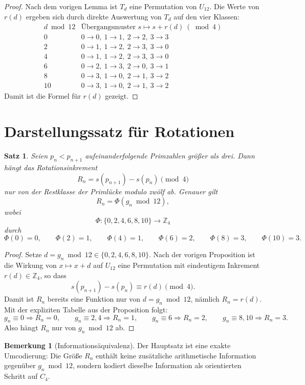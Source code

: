 \documentclass[11pt]{article}
\newtheorem{theorem}{Satz}
\theoremstyle{definition}
\newtheorem{remark}{Bemerkung}
\begin{document}
\begin{proof}
Nach dem vorigen Lemma ist $T_d$ eine Permutation von $U_{12}$.
Die Werte von $r(d)$ ergeben sich durch direkte Auswertung von $T_d$ auf den vier Klassen:
\[
\begin{array}{c|c}
d \bmod 12 & \text{\"Ubergangsmuster } s\mapsto s+r(d)\ (\bmod 4)\\
\hline
0   & 0\to0,\ 1\to1,\ 2\to2,\ 3\to3\\
2   & 0\to1,\ 1\to2,\ 2\to3,\ 3\to0\\
4   & 0\to1,\ 1\to2,\ 2\to3,\ 3\to0\\
6   & 0\to2,\ 1\to3,\ 2\to0,\ 3\to1\\
8   & 0\to3,\ 1\to0,\ 2\to1,\ 3\to2\\
10  & 0\to3,\ 1\to0,\ 2\to1,\ 3\to2
\end{array}
\]
Damit ist die Formel f\"ur $r(d)$ gezeigt.
\end{proof}

\section{Darstellungssatz f\"ur Rotationen}

\begin{theorem}
Seien $p_n<p_{n+1}$ aufeinanderfolgende Primzahlen gr\"o{\ss}er als drei.
Dann h\"angt das Rotationsinkrement
\[
R_n=s(p_{n+1})-s(p_n)\pmod 4
\]
nur von der Restklasse der Priml\"ucke modulo zw\"olf ab.
Genauer gilt
\[
R_n=\Phi(g_n\bmod 12),
\]
wobei
\[
\Phi:\{0,2,4,6,8,10\}\rightarrow\mathbb{Z}_4
\]
durch
\[
\Phi(0)=0,\qquad
\Phi(2)=1,\qquad
\Phi(4)=1,\qquad
\Phi(6)=2,\qquad
\Phi(8)=3,\qquad
\Phi(10)=3.
\]
\end{theorem}

\begin{proof}
Setze $d=g_n\bmod 12\in\{0,2,4,6,8,10\}$.
Nach der vorigen Proposition ist die Wirkung von $x\mapsto x+d$ auf $U_{12}$
eine Permutation mit eindeutigem Inkrement $r(d)\in\mathbb{Z}_4$, so dass
\[
s(p_{n+1})-s(p_n)\equiv r(d)\pmod 4.
\]
Damit ist $R_n$ bereits eine Funktion nur von $d=g_n\bmod 12$, n\"amlich $R_n=r(d)$.
Mit der expliziten Tabelle aus der Proposition folgt:
\[
g_n\equiv0 \Rightarrow R_n=0,\qquad
g_n\equiv2,4 \Rightarrow R_n=1,\qquad
g_n\equiv6 \Rightarrow R_n=2,\qquad
g_n\equiv8,10 \Rightarrow R_n=3.
\]
Also h\"angt $R_n$ nur von $g_n \bmod 12$ ab.
\end{proof}

\begin{remark}[Informations\"aquivalenz]
Der Hauptsatz ist eine exakte Umcodierung:
Die Gr\"o{\ss}e $R_n$ enth\"alt keine zus\"atzliche arithmetische Information
gegen\"uber $g_n\bmod 12$, sondern kodiert dieselbe Information als
orientierten Schritt auf $C_4$.
\end{remark}
\end{document}
